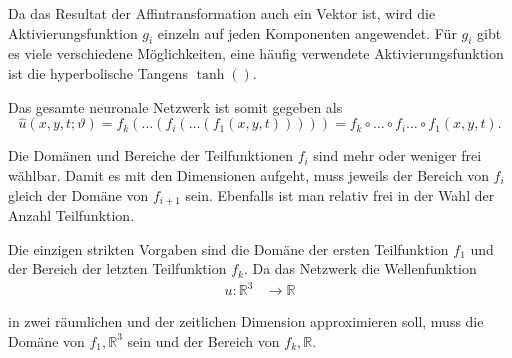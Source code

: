 Da das Resultat der Affintransformation auch ein Vektor ist, wird die Aktivierungsfunktion \( g_i \) einzeln auf jeden Komponenten angewendet.
Für \( g_i \) gibt es viele verschiedene Möglichkeiten, eine häufig verwendete Aktivierungsfunktion ist die hyperbolische Tangens \( \tanh() \).

Das gesamte neuronale Netzwerk ist somit gegeben als
\begin{equation}
    \hat{u}(x, y, t; \vartheta) = f_k(\ldots(f_i(\ldots(f_1(x, y, t))))) = f_k \circ \ldots \circ f_i \ldots \circ f_1(x, y, t).
    \label{neuronal:nn_ausformuliert}
\end{equation}

Die Domänen und Bereiche der Teilfunktionen \( f_i \) sind mehr oder weniger frei wählbar.
Damit es mit den Dimensionen aufgeht, muss jeweils der Bereich von \( f_i \) gleich der Domäne von \( f_{i+1} \) sein.
Ebenfalls ist man relativ frei in der Wahl der Anzahl Teilfunktion.

Die einzigen strikten Vorgaben sind die Domäne der ersten Teilfunktion \( f_1 \) und der Bereich der letzten Teilfunktion \( f_k \).
Da das Netzwerk die Wellenfunktion
\begin{align*}
    u\colon \mathbb{R}^3 & \longrightarrow\mathbb{R}
\end{align*}

in zwei räumlichen und der zeitlichen Dimension approximieren soll, muss die Domäne von \( f_1, \mathbb{R}^3\) sein und der Bereich von \( f_k, \mathbb{R}\).
